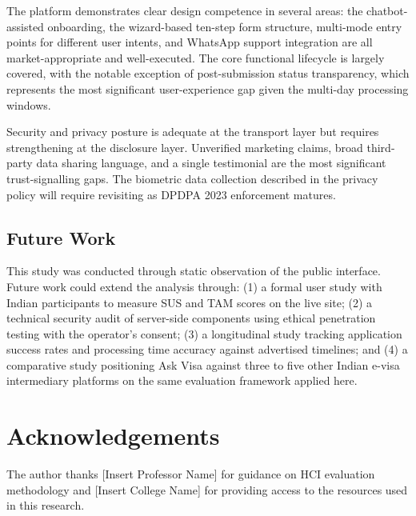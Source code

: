 \documentclass[journal, 10pt, twoside]{IEEEtran}
\begin{document}
The platform demonstrates clear design competence in several areas: the
chatbot-assisted onboarding, the wizard-based ten-step form structure,
multi-mode entry points for different user intents, and WhatsApp support
integration are all market-appropriate and well-executed. The core
functional lifecycle is largely covered, with the notable exception of
post-submission status transparency, which represents the most significant
user-experience gap given the multi-day processing windows.

Security and privacy posture is adequate at the transport layer but
requires strengthening at the disclosure layer. Unverified marketing
claims, broad third-party data sharing language, and a single testimonial
are the most significant trust-signalling gaps. The biometric data
collection described in the privacy policy will require revisiting as
DPDPA 2023 enforcement matures.

\subsection{Future Work}
This study was conducted through static observation of the public interface.
Future work could extend the analysis through: (1) a formal user study with
Indian participants to measure SUS and TAM scores on the live site; (2) a
technical security audit of server-side components using ethical
penetration testing with the operator's consent; (3) a longitudinal study
tracking application success rates and processing time accuracy against
advertised timelines; and (4) a comparative study positioning Ask Visa
against three to five other Indian e-visa intermediary platforms on the
same evaluation framework applied here.

\section*{Acknowledgements}
The author thanks [Insert Professor Name] for guidance on HCI evaluation
methodology and [Insert College Name] for providing access to the resources
used in this research.
\end{document}
